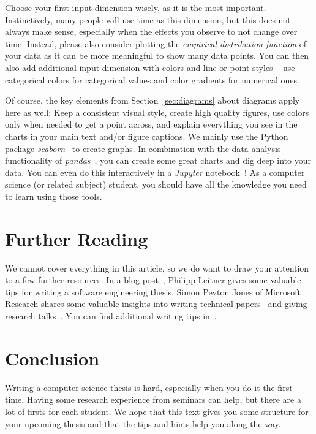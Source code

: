 \documentclass[a4]{article}
\begin{document}
Choose your first input dimension wisely, as it is the most important.
Instinctively, many people will use time as this dimension, but this does not always make sense, especially when the effects you observe to not change over time.
Instead, please also consider plotting the \emph{empirical distribution function} of your data as it can be more meaningful to show many data points.
You can then also add additional input dimension with colors and line or point styles -- use categorical colors for categorical values and color gradients for numerical ones.

Of course, the key elements from Section~\ref{sec:diagrams} about diagrams apply here as well:
Keep a consistent visual style, create high quality figures, use colors only when needed to get a point across, and explain everything you see in the charts in your main text and/or figure captions.
We mainly use the Python package \emph{seaborn}~\cite{seaborn} to create graphs.
In combination with the data analysis functionality of \emph{pandas}~\cite{pandas}, you can create some great charts and dig deep into your data.
You can even do this interactively in a \emph{Jupyter} notebook~\cite{jupyter}!
As a computer science (or related subject) student, you should have all the knowledge you need to learn using those tools.

\section{Further Reading}
\label{sec:resources}

We cannot cover everything in this article, so we do want to draw your attention to a few further resources.
In a blog post~\cite{leitner}, Philipp Leitner gives some valuable tips for writing a software engineering thesis.
Simon Peyton Jones of Microsoft Research shares some valuable insights into writing technical papers~\cite{jones-paper} and giving research talks~\cite{jones-talk}.
You can find additional writing tips in~\cite{patterson-writing,ernst-writing,schulzrinne-writing}.

\section{Conclusion}
\label{sec:conclusion}

Writing a computer science thesis is hard, especially when you do it the first time.
Having some research experience from seminars can help, but there are a lot of firsts for each student.
We hope that this text gives you some structure for your upcoming thesis and that the tips and hints help you along the way.

\printbibliography
\end{document}
